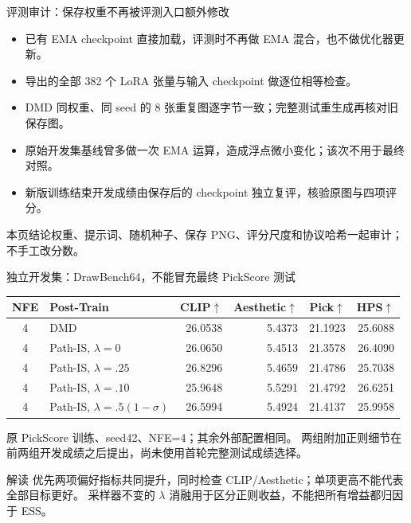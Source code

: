 \documentclass[10pt,aspectratio=169]{beamer}
\newcommand{\takeaway}[1]{\begin{exampleblock}{本页结论}\small #1\end{exampleblock}}
\begin{document}
\begin{frame}{评测审计：保存权重不再被评测入口额外修改}
\small
\begin{itemize}\itemsep5pt
\item 已有 EMA checkpoint 直接加载，评测时不再做 EMA 混合，也不做优化器更新。
\item 导出的全部 382 个 LoRA 张量与输入 checkpoint 做逐位相等检查。
\item DMD 同权重、同 seed 的 8 张重复图逐字节一致；完整测试重生成再核对旧保存图。
\item 原始开发集基线曾多做一次 EMA 运算，造成浮点微小变化；该次不用于最终对照。
\item 新版训练结束开发成绩由保存后的 checkpoint 独立复评，核验原图与四项评分。
\end{itemize}
\takeaway{权重、提示词、随机种子、保存 PNG、评分尺度和协议哈希一起审计；不手工改分数。}
\end{frame}
\begin{frame}{独立开发集：DrawBench64，不能冒充最终 PickScore 测试}
\small
\centering
\begin{tabular}{clrrrr}\toprule
NFE & Post-Train & CLIP$\uparrow$ & Aesthetic$\uparrow$ & Pick$\uparrow$ & HPS$\uparrow$\\\midrule
4 & DMD & 26.0538 & 5.4373 & 21.1923 & 25.6088 \\
4 & Path-IS, $\lambda=0$ & 26.0650 & 5.4513 & 21.3578 & 26.4090 \\
4 & Path-IS, $\lambda=.25$ & 26.8296 & 5.4659 & 21.4786 & 25.7038 \\
4 & Path-IS, $\lambda=.10$ & 25.9648 & 5.5291 & 21.4792 & 26.6251 \\
4 & Path-IS, $\lambda=.5(1-\sigma)$ & 26.5994 & 5.4924 & 21.4137 & 25.9958 \\\bottomrule\end{tabular}
\par\raggedright\vspace{4pt}
原 PickScore 训练、seed42、NFE=4；其余外部配置相同。
两组附加正则细节在前两组开发成绩之后提出，尚未使用首轮完整测试成绩选择。
\begin{alertblock}{解读}
优先两项偏好指标共同提升，同时检查 CLIP/Aesthetic；单项更高不能代表全部目标更好。
采样器不变的 $\lambda$ 消融用于区分正则收益，不能把所有增益都归因于 ESS。
\end{alertblock}
\end{frame}
\end{document}
